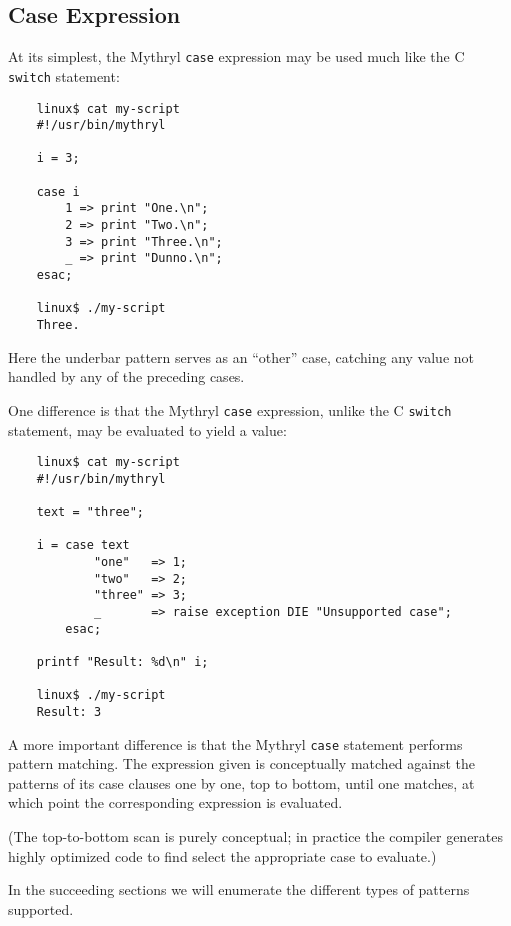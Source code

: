 
\subsection{Case Expression}
\label{section:ref:case-expressions-and-pattern-matching:case-expression}

At its simplest, the Mythryl {\tt case} expression may 
be used much like the C {\tt switch} statement:

\begin{verbatim}
    linux$ cat my-script
    #!/usr/bin/mythryl

    i = 3;

    case i
        1 => print "One.\n";
        2 => print "Two.\n";
        3 => print "Three.\n";
        _ => print "Dunno.\n";
    esac;

    linux$ ./my-script
    Three.
\end{verbatim}

Here the underbar pattern serves as an ``other'' case, 
catching any value not handled by any of the preceding 
cases. 

One difference is that the Mythryl {\tt case} expression, 
unlike the C {\tt switch} statement, may be evaluated to 
yield a value:

\begin{verbatim}
    linux$ cat my-script
    #!/usr/bin/mythryl

    text = "three";

    i = case text
            "one"   => 1;
            "two"   => 2;
            "three" => 3;
            _       => raise exception DIE "Unsupported case";
        esac;

    printf "Result: %d\n" i;

    linux$ ./my-script
    Result: 3
\end{verbatim}

A more important difference is that the Mythryl {\tt case} 
statement performs pattern matching.  The expression 
given is conceptually matched against the patterns of its 
case clauses one by one, top to bottom, until one matches, 
at which point the corresponding expression is evaluated.

(The top-to-bottom scan is purely conceptual;  in practice 
the compiler generates highly optimized code to find select 
the appropriate case to evaluate.)

In the succeeding sections we will enumerate the different 
types of patterns supported.

